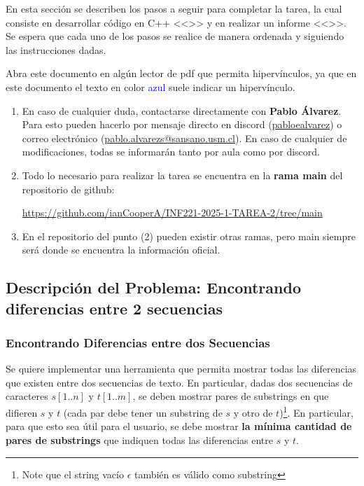 En esta sección se describen los pasos a seguir para completar la tarea, la cual consiste en desarrollar código en C++ <<>> y en realizar un informe <<>>. Se espera que cada uno de los pasos se realice de manera ordenada y siguiendo las instrucciones dadas.

\begin{mdframed}
    Abra este documento en algún lector de pdf que permita hipervínculos, ya que en este documento el texto en color \textcolor{blue}{azul} suele indicar un hipervínculo.
\end{mdframed}

\begin{enumerate}[(1)]
    \item 
    En caso de cualquier duda, contactarse directamente con \textbf{Pablo Álvarez}. Para esto pueden hacerlo por mensaje directo en discord (\url{pabloealvarez}) o correo electrónico (\url{pablo.alvarezs@sansano.usm.cl}). En caso de cualquier de modificaciones, todas se informarán tanto por aula como por discord.
    \item Todo lo necesario para realizar la tarea se encuentra en la \textbf{rama main} del repositorio de github:
\begin{center}

    \url{https://github.com/ianCooperA/INF221-2025-1-TAREA-2/tree/main}
        
\end{center}
\item En el repositorio del punto (2) pueden existir otras ramas, pero main siempre será donde se encuentra la información oficial.
\end{enumerate}

\subsection{Descripción del Problema: Encontrando diferencias entre 2 secuencias}
\subsubsection{Encontrando Diferencias entre dos Secuencias}

Se quiere implementar una herramienta que permita mostrar todas las diferencias que existen entre dos secuencias de texto. En particular, dadas dos secuencias de caracteres $s[1{..}n]$ y $t[1{..}m]$, se deben mostrar pares de substrings en que difieren $s$ y $t$ (cada par debe tener un substring de $s$  y otro de $t$)\footnote{Note que el string vacío $\epsilon$ también es válido como substring}. En particular, para que esto sea útil para el usuario, se debe mostrar \textbf{la mínima cantidad de pares de substrings} que indiquen todas las diferencias entre $s$ y $t$. 

